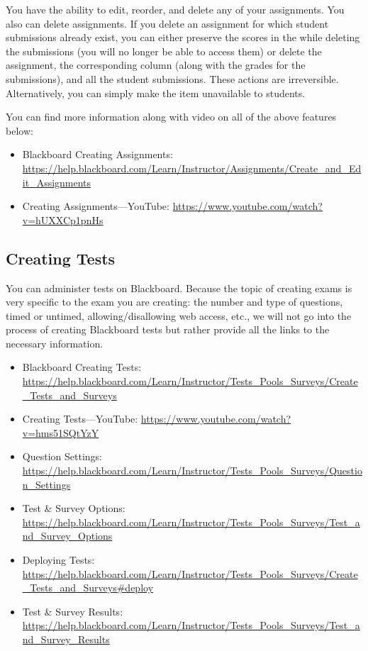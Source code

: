 You have the ability to edit, reorder, and delete any of your assignments. You also can delete assignments. If you delete an assignment for which student submissions already exist, you can either preserve the scores in the  while deleting the submissions (you will no longer be able to access them) or delete the assignment, the corresponding  column (along with the grades for the submissions), and all the student submissions. These actions are irreversible. Alternatively, you can simply make the item unavailable to students. 

You can find more information along with video on all of the above features below:

	\begin{itemize}
	\item Blackboard Creating Assignments: \url{https://help.blackboard.com/Learn/Instructor/Assignments/Create_and_Edit_Assignments}
	\item Creating Assignments---YouTube: \url{https://www.youtube.com/watch?v=hUXXCp1pnHs}
	\end{itemize}



\subsection{Creating Tests}

You can administer tests on Blackboard. Because the topic of creating exams is very specific to the exam you are creating: the number and type of questions, timed or untimed, allowing/disallowing web access, etc., we will not go into the process of creating Blackboard tests but rather provide all the links to the necessary information.

	\begin{itemize}
	\item Blackboard Creating Tests: \url{https://help.blackboard.com/Learn/Instructor/Tests_Pools_Surveys/Create_Tests_and_Surveys}
	\item Creating Tests---YouTube: \url{https://www.youtube.com/watch?v=hms51SQtYzY}
	\item Question Settings: \url{https://help.blackboard.com/Learn/Instructor/Tests_Pools_Surveys/Question_Settings}
	\item Test \& Survey Options: \url{https://help.blackboard.com/Learn/Instructor/Tests_Pools_Surveys/Test_and_Survey_Options}
	\item Deploying Tests: \url{https://help.blackboard.com/Learn/Instructor/Tests_Pools_Surveys/Create_Tests_and_Surveys#deploy}
	\item Test \& Survey Results: \url{https://help.blackboard.com/Learn/Instructor/Tests_Pools_Surveys/Test_and_Survey_Results}
	\end{itemize}





